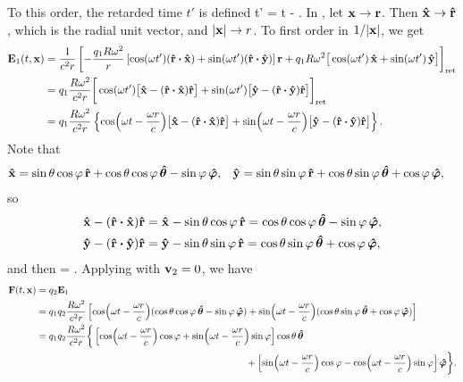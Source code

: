 \begin{solution}
	To this order, the retarded time $t'$ is defined
	\beqn \label{rettime}
		t' = t - .
	\eeqn
	In , let $\vb{x} \to \vb{r}$.  Then $\vb{\hat{x}} \to \vb{\hat{r}}$, which is the radial unit vector, and $\abs{\vb{x}} \to r$.  To first order in $1/\abs{\vb{x}}$, we get
	\begin{align*}
		\vEq\tx &= \frac{1}{c^2 r} \left[ -\frac{\qq R \omg^2}{r} \left[ \cos(\omg t') (\rh \vdot \xh) + \sin(\omg t') (\rh \vdot \yh) \right] \vr + \qq R \omg^2 \big[ \cos(\omg t') \,\xh + \sin(\omg t') \,\yh \big] \right]_\ret \\
		&= \qq \frac{R \omg^2}{c^2 r} \bigg[ \cos(\omg t') \big[ \xh - (\rh \vdot \xh) \rh \big] + \sin(\omg t') \big[ \yh - (\rh \vdot \yh) \rh \big] \bigg]_\ret \\
		&= \qq \frac{R \omg^2}{c^2 r} \left\{ \cos(\omg t - \frac{\omg r}{c}) \big[ \xh - (\rh \vdot \xh) \rh \big] + \sin(\omg t - \frac{\omg r}{c}) \big[ \yh - (\rh \vdot \yh) \rh \big] \right\}.
	\end{align*}
	Note that
	\begin{align*}
		\vb{\hat{x}} &= \sin\theta \cos\varphi \,\vb{\hat{r}} + \cos\theta \cos\varphi \,\boldsymbol{\hat{\theta}} - \sin\varphi \,\boldsymbol{\hat{\varphi}}, &
		\vb{\hat{y}} &= \sin\theta \sin\varphi \,\vb{\hat{r}} + \cos\theta \sin\varphi \,\boldsymbol{\hat{\theta}} + \cos\varphi \,\boldsymbol{\hat{\varphi}},
	\end{align*}
	so
	\begin{align*}
		\xh - (\rh \vdot \xh) \rh &= \xh - \sin\tht \cos\vph \,\rh
		= \cos\tht \cos\vph \,\thh - \sin\vph \,\phh, \\
		\yh - (\rh \vdot \yh) \rh &= \yh - \sin\tht \sin\vph \,\rh
		= \cos\tht \sin\vph \,\thh + \cos\vph \,\phh,
	\end{align*}
	and then
	\beq
		\vEq\tx = \qq {} .
	\eeq
	Applying  with $\vb{v}_2 = 0$, we have
	\begin{align*}
		\vb{F}(t, \vb{x}) &= q_2 \vb{E}_1 \\
		&= q_1 q_2 \frac{R \omega^2}{c^2 r} \left[ \cos(\omega t - \frac{\omega r}{c}) (\cos\theta \cos\varphi \,\boldsymbol{\hat{\theta}} - \sin\varphi \,\boldsymbol{\hat{\varphi}}) + \sin(\omega t - \frac{\omega r}{c}) (\cos\theta \sin\varphi \,\boldsymbol{\hat{\theta}} + \cos\varphi \,\boldsymbol{\hat{\varphi}}) \right] \\
		&= q_1 q_2 \frac{R \omega^2}{c^2 r} \bigg\{ \left[ \cos(\omega t - \frac{\omega r}{c}) \cos\varphi + \sin(\omega t - \frac{\omega r}{c}) \sin\varphi \right] \cos\theta \,\boldsymbol{\hat{\theta}} \\ 
		&\phantom{mmmmmmmmmmmmmmmmmmmmmmmmm} + \left[ \sin(\omega t - \frac{\omega r}{c}) \cos\varphi - \cos(\omega t - \frac{\omega r}{c}) \sin\varphi \right] \boldsymbol{\hat{\varphi}} \bigg\}.
	\end{align*}
	\vfix
\end{solution}
